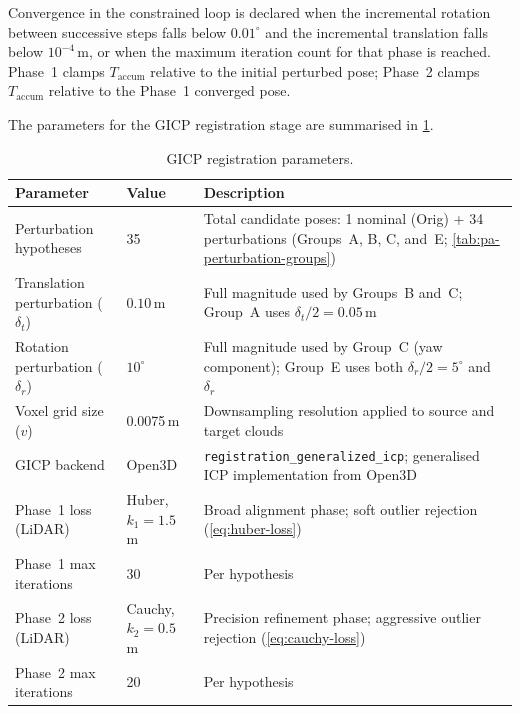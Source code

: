 Convergence in the constrained loop is declared when the incremental rotation between successive steps falls below $0.01^{\circ}$ and the incremental translation falls below $10^{-4}$\,m, or when the maximum iteration count for that phase is reached. Phase~1 clamps $T_{\text{accum}}$ relative to the initial perturbed pose; Phase~2 clamps $T_{\text{accum}}$ relative to the Phase~1 converged pose.

The parameters for the GICP registration stage are summarised in \cref{tab:pa-icp-params}.

\begin{table}[htbp]
  \centering
  \caption{GICP registration parameters.}
  \label{tab:pa-icp-params}
  \begin{tabularx}{\textwidth}{@{} >{\raggedright}p{} >{\raggedright}p{} >{\raggedright\arraybackslash}X @{}}
    \toprule
    \textbf{Parameter} & \textbf{Value} & \textbf{Description} \\
    \midrule
    Perturbation hypotheses         & 35                  & Total candidate poses: 1 nominal (Orig) + 34 perturbations (Groups~A, B, C, and~E; \cref{tab:pa-perturbation-groups}) \\
    Translation perturbation ($\delta_t$) & $0.10$\,m & Full magnitude used by Groups~B and~C; Group~A uses $\delta_t / 2 = 0.05$\,m \\
    Rotation perturbation ($\delta_r$)    & $10^{\circ}$ & Full magnitude used by Group~C (yaw component); Group~E uses both $\delta_r / 2 = 5^{\circ}$ and $\delta_r$ \\
    Voxel grid size ($v$)           & 0.0075\,m           & Downsampling resolution applied to source and target clouds \\
    GICP backend                    & Open3D              & \texttt{registration\_generalized\_icp}; generalised ICP implementation from Open3D~\cite{zhouOpen3DModernLibrary2018} \\
    Phase~1 loss (LiDAR)            & Huber, $k_1 = 1.5$\,m & Broad alignment phase; soft outlier rejection (\cref{eq:huber-loss}) \\
    Phase~1 max iterations          & 30                  & Per hypothesis \\
    Phase~2 loss (LiDAR)            & Cauchy, $k_2 = 0.5$\,m & Precision refinement phase; aggressive outlier rejection (\cref{eq:cauchy-loss}) \\
    Phase~2 max iterations          & 20                  & Per hypothesis \\

\end{tabularx}
\end{table}
